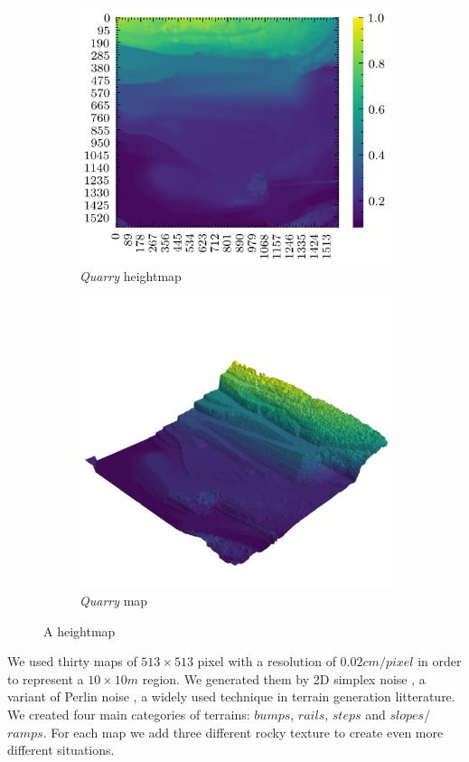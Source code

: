 \documentclass[../document.tex]{subfiles}
\begin{document}
\begin{figure}[H]
    \centering
        \begin{subfigure}[b]{0.45\textwidth}
            \includegraphics[width=\textwidth]{../img/hm/querry-big-10.png}
            \caption{\emph{Quarry} heightmap}
        \end{subfigure}
        \begin{subfigure}[b]{0.45\linewidth}
            \includegraphics[width=\textwidth]{../img/hm3d/querry-big-10.png}
            \caption{\emph{Quarry} map}
            \end{subfigure}    
    \caption{A heightmap}
    \end{figure}
We used thirty maps of $513\times513$ pixel with a resolution of $0.02cm/pixel$ in order to represent a $10\times10m$ region. We generated them by 2D simplex noise \cite{simplex}, a variant of Perlin noise \cite{perlin}, a widely used technique in terrain generation litterature. We created four main categories of terrains: $bumps$, $rails$, $steps$ and $slopes$/$ramps$. For each map we add three different rocky texture to create even more different situations.
\end{document}
